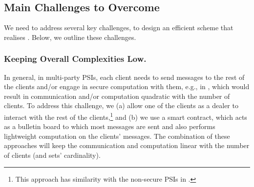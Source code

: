 \vs

\subsection{Main Challenges to Overcome}

 We need to address several key challenges, to design an efficient scheme that realises \p. Below, we outline these challenges.
 
 \vs
 
 
 \subsubsection{Keeping Overall Complexities Low.}
 
 In general, in multi-party PSIs, each client needs to send messages to the rest of the clients and/or engage in secure computation with them, e.g., in \cite{DBLP:conf/scn/InbarOP18,DBLP:conf/ccs/KolesnikovMPRT17}, which would result in communication and/or computation quadratic with the number of clients. To address this challenge, we  (a) allow one of the clients as a dealer to interact with the rest of the clients,\footnote{This approach has similarity with the non-secure PSIs in \cite{GhoshN19}.} and   (b) we use a smart contract, which acts as a bulletin board to which most messages are sent and also performs lightweight computation on the clients' messages. The combination of these approaches will keep the communication and computation linear with the number of clients (and sets' cardinality). 
 
 

 
 
 \vs
 \vs
 
